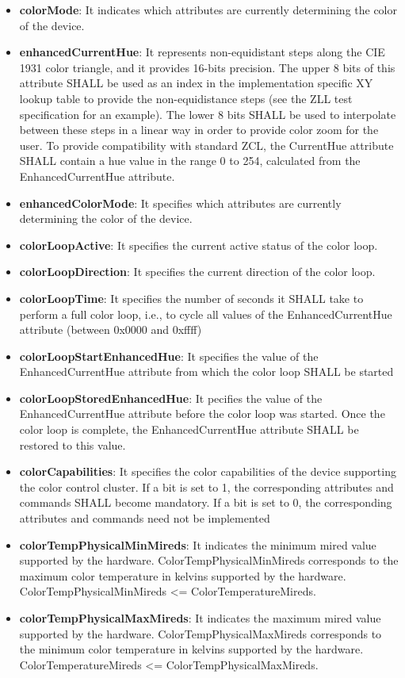 \begin{itemize}
\item \textbf{colorMode}: It indicates which attributes are currently determining the color of the device.
\item \textbf{enhancedCurrentHue}: It represents non-equidistant steps along the CIE 1931 color triangle, and it provides 16-bits precision. The upper 8 bits of this attribute SHALL be used as an index in the implementation specific XY lookup table to provide the non-equidistance steps (see the ZLL test specification for an example). The lower 8 bits SHALL be used to interpolate between these steps in a linear way in order to provide color zoom for the user. To provide compatibility with standard ZCL, the CurrentHue attribute SHALL contain a hue value in the range 0 to 254, calculated from the EnhancedCurrentHue attribute.
\item \textbf{enhancedColorMode}: It specifies which attributes are currently determining the color of the device.
\item \textbf{colorLoopActive}: It specifies the current active status of the color loop.
\item \textbf{colorLoopDirection}: It specifies the current direction of the color loop.
\item \textbf{colorLoopTime}: It specifies the number of seconds it SHALL take to perform a full color loop, i.e., to cycle all values of the EnhancedCurrentHue attribute (between 0x0000 and 0xffff)
\item \textbf{colorLoopStartEnhancedHue}: It specifies the value of the EnhancedCurrentHue attribute from which the color loop SHALL be started
\item \textbf{colorLoopStoredEnhancedHue}: It pecifies the value of the EnhancedCurrentHue attribute before the color loop was started. Once the color loop is complete, the EnhancedCurrentHue attribute SHALL be restored to this value.
\item \textbf{colorCapabilities}: It specifies the color capabilities of the device supporting the color control cluster. If a bit is set to 1, the corresponding attributes and commands SHALL become mandatory. If a bit is set to 0, the corresponding attributes and commands need not be implemented
\item \textbf{colorTempPhysicalMinMireds}: It indicates the minimum mired value supported by the hardware. ColorTempPhysicalMinMireds corresponds to the maximum color temperature in kelvins supported by the hardware. ColorTempPhysicalMinMireds <= ColorTemperatureMireds.
\item \textbf{colorTempPhysicalMaxMireds}: It indicates the maximum mired value supported by the hardware. ColorTempPhysicalMaxMireds corresponds to the minimum color temperature in kelvins supported by the hardware. ColorTemperatureMireds <= ColorTempPhysicalMaxMireds.

\end{itemize}
